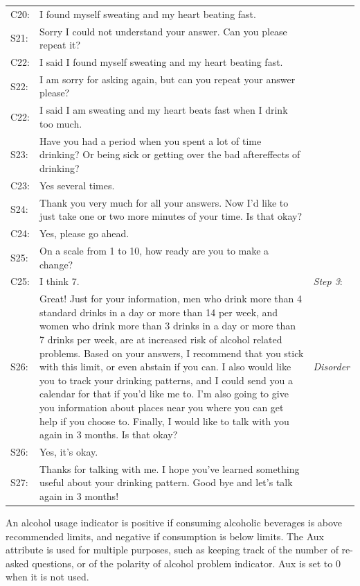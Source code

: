 \begin{sloppy}
\begin{table}
\begin{tabular}{ | l | p{13.5cm} | p{19mm} |}
	C20: & I found myself sweating and my heart beating fast. & \\
	S21: & Sorry I could not understand your answer. Can you please repeat it? & \\
	C22: & I said I found myself sweating and my heart beating fast. & \\ 
	S22: & I am sorry for asking again, but can you repeat your answer please? & \\
	C22: & I said I am sweating and my heart beats fast when I drink too much. & \\
	S23: & Have you had a period when you spent a lot of time drinking? Or being sick or getting over the bad aftereffects of drinking? & \\
	C23: & Yes several times. & \\
	\hline
	S24: & Thank you very much for all your answers. Now I'd like to just take one or two more minutes of your time. Is that okay? &\\
	C24: & Yes, please go ahead. & \\
	S25: & On a scale from 1 to 10, how ready are you to make a change? & \\ 
	C25: & I think 7. & {\em Step 3}:  \\
	S26: & Great! Just for your information,  men who drink more than 4 standard drinks in a day or more than 14 per week, and  women  who drink more than 3 drinks in a day or more than 7 drinks per week, are at increased risk of  alcohol related problems. Based on your answers, I recommend that you stick with this limit, or even abstain if you can.  I also would like you to track your drinking patterns, and I could send you a calendar for that if you'd like me to. I'm also going to give you information about places near you where you can get help if you choose to.  Finally, I would like to talk with you again in 3 months. Is that okay? & {\em Disorder} \\
	S26: & Yes, it's okay. & \\
	S27: & Thanks for talking with me. I hope you've learned something useful about your drinking pattern.  Good bye and let's talk again in 3 months! & \\
 	\hline
    \end{tabular}
   \end{table}

\twocolumn

 An alcohol usage indicator is positive if consuming alcoholic beverages is above recommended limits, and negative if consumption is below limits. The Aux attribute is used for multiple purposes, such as keeping track of the number of re-asked questions, or of the polarity of alcohol problem indicator. Aux is set to 0 when it is not used.


\end{sloppy}
